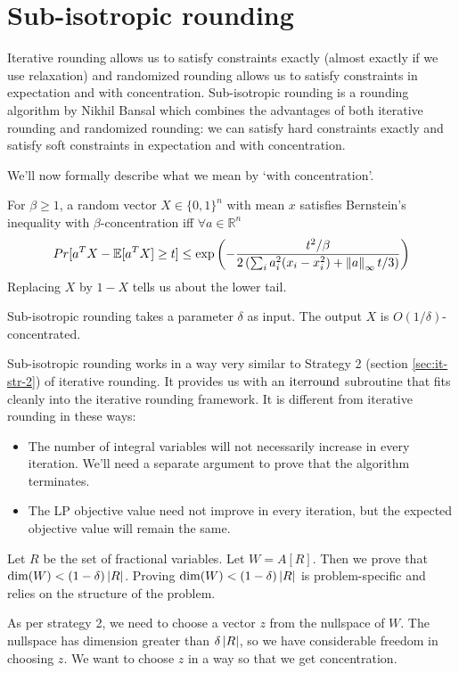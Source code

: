 \section{Sub-isotropic rounding}

Iterative rounding allows us to satisfy constraints exactly
(almost exactly if we use relaxation) and randomized rounding allows us to
satisfy constraints in expectation and with concentration.
Sub-isotropic rounding is a rounding algorithm by Nikhil Bansal
which combines the advantages of both iterative rounding and randomized rounding:
we can satisfy hard constraints exactly and satisfy soft constraints
in expectation and with concentration.

We'll now formally describe what we mean by `with concentration'.
\begin{definition} 
For $\beta \geq 1$, a random vector $X \in \{0, 1\}^n$ with mean $x$
satisfies Bernstein's inequality with $\beta$-concentration
iff $\forall a \in \mathbb{R}^n$
\[ Pr[a^T X - \operatorname{\mathbb{E}}[a^T X] \ge t] \leq \exp\left(-\frac{t^2/\beta}{
2\left(\sum_i a_i^2(x_i - x_i^2) + \left\lVert a \right\rVert_{\infty}t/3\right)}\right) \]
Replacing $X$ by $1-X$ tells us about the lower tail.
\end{definition}
Sub-isotropic rounding takes a parameter $\delta$ as input.
The output $X$ is $O(1/\delta)$-concentrated.

Sub-isotropic rounding works in a way very similar to
Strategy 2 (section \ref{sec:it-str-2}) of iterative rounding.
It provides us with an $\operatorname{iterround}$ subroutine
that fits cleanly into the iterative rounding framework.
It is different from iterative rounding in these ways:
\begin{itemize}
\item The number of integral variables will not necessarily increase in every iteration.
We'll need a separate argument to prove that the algorithm terminates.
\item The LP objective value need not improve in every iteration,
but the expected objective value will remain the same.
\end{itemize}

Let $R$ be the set of fractional variables. Let $W = A[R]$.
Then we prove that $\dim(W) < (1-\delta)\left\lvert R \right\rvert$.
Proving $\dim(W) < (1-\delta)\left\lvert R \right\rvert$ is problem-specific
and relies on the structure of the problem.

As per strategy 2, we need to choose a vector $z$ from the nullspace of $W$.
The nullspace has dimension greater than $\delta\left\lvert R \right\rvert$,
so we have considerable freedom in choosing $z$.
We want to choose $z$ in a way so that we get concentration.


